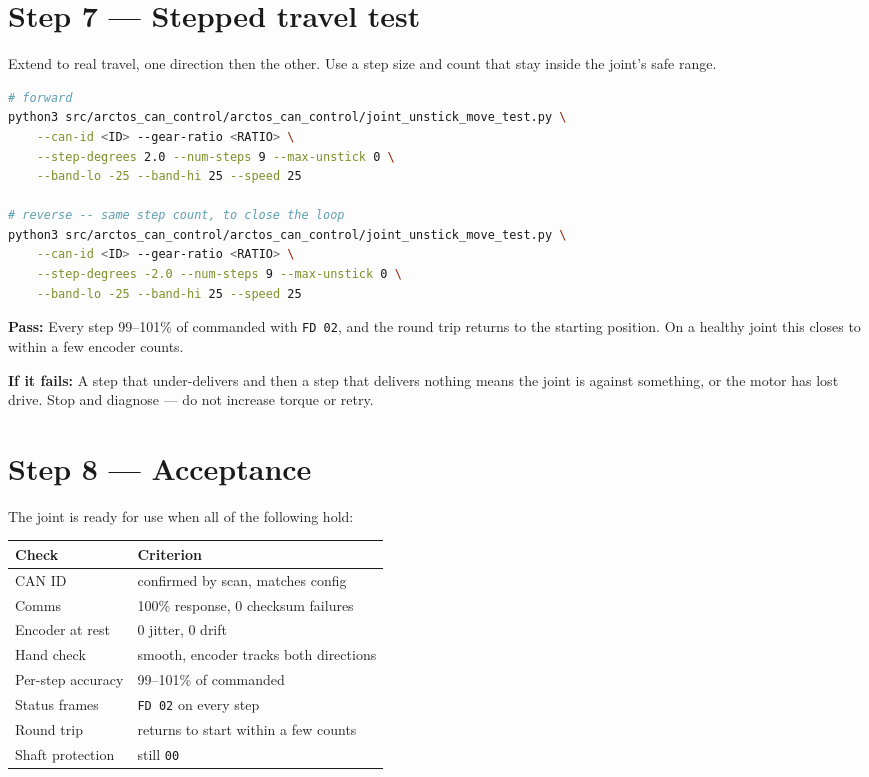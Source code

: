 \documentclass[11pt,letterpaper]{article}
\newcommand{\passif}[1]{\par\vspace{2pt}\noindent\textbf{\color{okgreen}Pass:} #1\par\vspace{4pt}}
\newcommand{\failif}[1]{\noindent\textbf{If it fails:} #1\par\vspace{6pt}}
\begin{document}
\section*{Step 7 --- Stepped travel test}
Extend to real travel, one direction then the other. Use a step size and count that
stay inside the joint's safe range.
\begin{lstlisting}[language=bash]
# forward
python3 src/arctos_can_control/arctos_can_control/joint_unstick_move_test.py \
    --can-id <ID> --gear-ratio <RATIO> \
    --step-degrees 2.0 --num-steps 9 --max-unstick 0 \
    --band-lo -25 --band-hi 25 --speed 25

# reverse -- same step count, to close the loop
python3 src/arctos_can_control/arctos_can_control/joint_unstick_move_test.py \
    --can-id <ID> --gear-ratio <RATIO> \
    --step-degrees -2.0 --num-steps 9 --max-unstick 0 \
    --band-lo -25 --band-hi 25 --speed 25
\end{lstlisting}
\passif{Every step 99--101\% of commanded with \texttt{FD 02}, and the round trip
returns to the starting position. On a healthy joint this closes to within a few
encoder counts.}
\failif{A step that under-delivers and then a step that delivers nothing means the
joint is against something, or the motor has lost drive. Stop and diagnose --- do
not increase torque or retry.}

\section*{Step 8 --- Acceptance}
The joint is ready for use when all of the following hold:

\begin{table}[h]
\centering
\begin{tabular}{ll}
\toprule
\textbf{Check} & \textbf{Criterion} \\ \midrule
CAN ID           & confirmed by scan, matches config \\
Comms            & 100\% response, 0 checksum failures \\
Encoder at rest  & 0 jitter, 0 drift \\
Hand check       & smooth, encoder tracks both directions \\
Per-step accuracy & 99--101\% of commanded \\
Status frames    & \texttt{FD 02} on every step \\
Round trip       & returns to start within a few counts \\
Shaft protection & still \texttt{00} \\
\bottomrule
\end{tabular}
\end{table}
\end{document}

